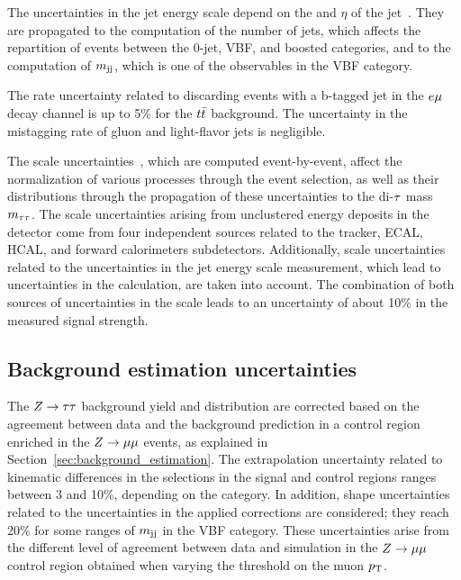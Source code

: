 The uncertainties in the jet energy scale depend on the \pt and $\eta$ of the jet~\cite{CMS-JME-10-011}.
They are propagated to the computation of the number of jets, which affects the repartition of events between the 0-jet, VBF, and boosted categories, and to the computation of $m_\mathrm{jj}$, which is one of the observables in the VBF category.

The rate uncertainty related to discarding events with a b-tagged jet in the $e\mu$ decay channel is up to
5\% for the $t\bar{t}$ background. The uncertainty in the mistagging rate of gluon and light-flavor jets is negligible.

The \etvecmiss scale uncertainties~\cite{CMS-JME-12-002}, which are computed event-by-event, affect the normalization of various processes through the event selection, as well as their distributions through the propagation of these uncertainties to the di-$\tau$ mass $m_{\tau\tau}$. The \etvecmiss scale uncertainties arising from unclustered energy deposits in the detector come from four independent sources related to the tracker, ECAL, HCAL, and forward calorimeters subdetectors. Additionally, \etvecmiss scale uncertainties related to the uncertainties in the jet energy scale measurement, which lead to uncertainties in the \etvecmiss calculation, are taken into account. The combination of both sources of uncertainties in the \etvecmiss scale leads to an uncertainty of about 10\% in the measured signal strength.

\subsection{Background estimation uncertainties}

The $Z\to\tau\tau$ background yield and distribution are corrected based on the agreement between data and the background prediction in a control region enriched in the $Z\to\mu\mu$ events, as explained in Section~\ref{sec:background_estimation}.
The extrapolation uncertainty related to kinematic differences in the selections in the signal and control regions ranges between 3 and 10\%, depending
on the category. In addition, shape uncertainties related to the uncertainties in the applied corrections are considered; they reach 20\% for some ranges of $m_\mathrm{jj}$ in the VBF category. These uncertainties arise from the different level of agreement between data and simulation in the $Z\to\mu\mu$ control region obtained when varying the threshold on the muon $p_\mathrm{T}$.

